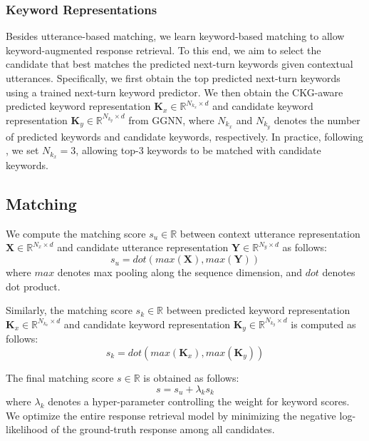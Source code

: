 \documentclass[letterpaper]{article} %
\begin{document}
\subsubsection{Keyword Representations}
Besides utterance-based matching, we learn keyword-based matching to allow keyword-augmented response retrieval. To this end, we aim to select the candidate that best matches the predicted next-turn keywords given contextual utterances. Specifically, we first obtain the top predicted next-turn keywords using a trained next-turn keyword predictor. We then obtain the CKG-aware predicted keyword representation $\mathbf{K}_x \in \mathbb{R}^{N_{k_x} \times d}$ and candidate keyword representation $\mathbf{K}_y \in \mathbb{R}^{N_{k_y} \times d}$ from GGNN, where $N_{k_x}$ and $N_{k_y}$ denotes the number of predicted keywords and candidate keywords, respectively. In practice, following \cite{tang2019target}, we set $N_{k_x} = 3$, allowing top-3 keywords to be matched with candidate keywords.

\subsection{Matching}
We compute the matching score $s_u \in \mathbb{R}$ between context utterance representation $\mathbf{X} \in \mathbb{R}^{N_x \times d}$ and candidate utterance representation $\mathbf{Y} \in \mathbb{R}^{N_y \times d}$ as follows:
\begin{equation}
\label{eqn: utterance matching}
s_u = \textit{dot}(\textit{max}(\mathbf{X}), \textit{max}(\mathbf{Y}))
\end{equation}
where $\textit{max}$ denotes max pooling along the sequence dimension, and $\textit{dot}$ denotes dot product.

Similarly, the matching score $s_k \in \mathbb{R}$ between predicted keyword representation $\mathbf{K}_x \in \mathbb{R}^{N_{k_x} \times d}$ and candidate keyword representation $\mathbf{K}_y \in \mathbb{R}^{N_{k_y} \times d}$ is computed as follows:
\begin{equation}
\label{eqn: keyword matching}
s_k = \textit{dot}(\textit{max}(\mathbf{K}_x), \textit{max}(\mathbf{K}_y))
\end{equation}

The final matching score $s \in \mathbb{R}$ is obtained as follows:
\begin{equation}
\label{eqn: final matching}
s = s_u + \lambda_k s_k
\end{equation}
where $\lambda_k$ denotes a hyper-parameter controlling the weight for keyword scores. We optimize the entire response retrieval model by minimizing the negative log-likelihood of the ground-truth response among all candidates.
\end{document}
